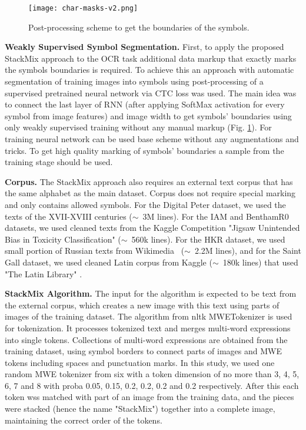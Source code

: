 \documentclass[10pt,twocolumn,letterpaper]{article}
\begin{document}
\begin{figure}
\begin{center}
\texttt{[image: char-masks-v2.png]}
\end{center}
   \caption{Post-processing scheme to get the boundaries of the symbols.}
\label{fig:char-masks}
\end{figure}


\medskip
\noindent 
\textbf{Weakly Supervised Symbol Segmentation.} First, to apply the proposed StackMix approach to the OCR task additional data markup that exactly marks the symbols boundaries is required. To achieve this an approach with automatic segmentation of training images into symbols using post-processing of a supervised pretrained neural network via CTC loss was used. The main idea was to connect the last layer of RNN (after applying SoftMax activation for every symbol from image features) and image width to get symbols' boundaries using only weakly supervised training without any manual markup (Fig. \ref{fig:char-masks}). For training neural network can be used base scheme without any augmentations and tricks. To get high quality marking of symbols' boundaries a sample from the training stage should be used. 








\medskip
\noindent 
\textbf{Corpus.} The StackMix approach also requires an external text corpus that has the same alphabet as the main dataset. Corpus does not require special marking and only contains allowed symbols. For the Digital Peter dataset, we used the texts of the XVII-XVIII centuries ($\sim$~3M lines). For the IAM and BenthamR0 datasets, we used cleaned texts from the Kaggle Competition "Jigsaw Unintended Bias in Toxicity Classification" \cite{jigsaw} ($\sim$~560k lines). For the HKR dataset, we used small portion of Russian texts from Wikimedia~\cite{ruwiki} ($\sim$~2.2M lines), and for the Saint Gall dataset, we used cleaned Latin corpus from Kaggle \cite{kaggle_latin_library} ($\sim$~180k lines) that used "The Latin Library" \cite{the_latin_library}.

\medskip
\noindent 
\textbf{StackMix Algorithm.} The input for the algorithm  is expected to be text from the external corpus, which creates a new image with this text using parts of images of the training dataset. The algorithm from nltk MWETokenizer \cite{nltkmwe} is used for tokenization. It processes tokenized text and merges multi-word expressions into single tokens. Collections of multi-word expressions are obtained from the training dataset, using symbol borders to connect parts of images and MWE tokens including spaces and punctuation marks. In this study, we used one random MWE tokenizer from six with a token dimension of no more than 3, 4, 5, 6, 7 and 8 with proba 0.05, 0.15, 0.2, 0.2, 0.2 and 0.2 respectively. After this each token wss matched with part of an image from the training data, and the pieces were stacked (hence the name "StackMix") together into a complete image, maintaining the correct order of the tokens.
\end{document}

